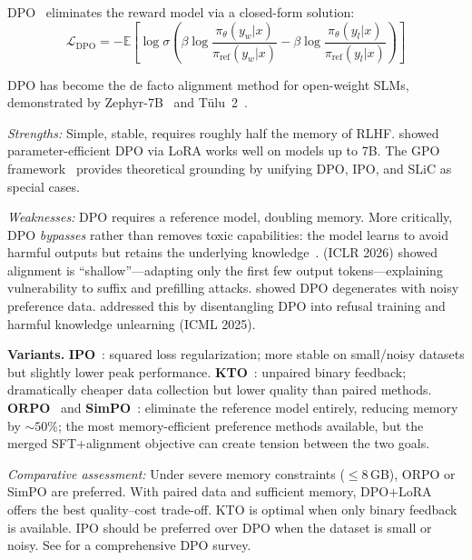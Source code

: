 \documentclass[12pt,a4paper]{article}
\begin{document}
DPO~\citep{rafailov2023direct} eliminates the reward model via a closed-form solution:
\begin{equation}
\mathcal{L}_{\text{DPO}} = -\mathbb{E}\!\left[\log\sigma\!\left(\beta\log\frac{\pi_\theta(y_w|x)}{\pi_{\text{ref}}(y_w|x)} - \beta\log\frac{\pi_\theta(y_l|x)}{\pi_{\text{ref}}(y_l|x)}\right)\right]
\end{equation}

DPO has become the de facto alignment method for open-weight SLMs, demonstrated by Zephyr-7B~\citep{tunstall2023zephyr} and T\"ulu~2~\citep{ivison2023tulu}.

\emph{Strengths:} Simple, stable, requires roughly half the memory of RLHF. \citet{thakkar2024tradeoffs} showed parameter-efficient DPO via LoRA works well on models up to 7B. The GPO framework~\citep{tang2024gpo} provides theoretical grounding by unifying DPO, IPO, and SLiC as special cases.

\emph{Weaknesses:} DPO requires a reference model, doubling memory. More critically, DPO \emph{bypasses} rather than removes toxic capabilities: the model learns to avoid harmful outputs but retains the underlying knowledge~\citep{arditi2024refusal}. \citet{qi2025shallow} (ICLR 2026) showed alignment is ``shallow''---adapting only the first few output tokens---explaining vulnerability to suffix and prefilling attacks. \citet{ethayarajh2024limits} showed DPO degenerates with noisy preference data. \citet{zhao2025dualobjective} addressed this by disentangling DPO into refusal training and harmful knowledge unlearning (ICML 2025).

\textbf{Variants.} \textbf{IPO}~\citep{azar2023general}: squared loss regularization; more stable on small/noisy datasets but slightly lower peak performance. \textbf{KTO}~\citep{ethayarajh2024kto}: unpaired binary feedback; dramatically cheaper data collection but lower quality than paired methods. \textbf{ORPO}~\citep{hong2024orpo} and \textbf{SimPO}~\citep{meng2024simpo}: eliminate the reference model entirely, reducing memory by ${\sim}50\%$; the most memory-efficient preference methods available, but the merged SFT+alignment objective can create tension between the two goals.

\emph{Comparative assessment:} Under severe memory constraints ($\leq$8\,GB), ORPO or SimPO are preferred. With paired data and sufficient memory, DPO+LoRA offers the best quality--cost trade-off. KTO is optimal when only binary feedback is available. IPO should be preferred over DPO when the dataset is small or noisy. See \citet{chen2024dposurvey} for a comprehensive DPO survey.
\end{document}
